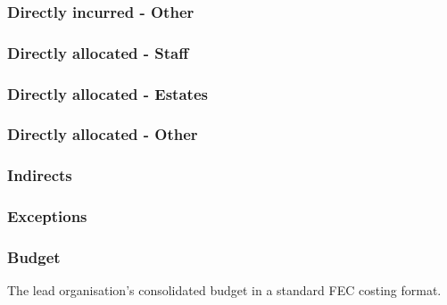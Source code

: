 \subsubsection{Directly incurred - Other}

\subsubsection{Directly allocated - Staff}

\subsubsection{Directly allocated - Estates}

\subsubsection{Directly allocated - Other}

\subsubsection{Indirects}

\subsubsection{Exceptions}

\subsubsection{Budget}

The lead organisation's consolidated budget in a standard FEC costing format.

